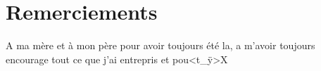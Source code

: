 \chapter*{Remerciements}

A ma m\`{e}re et \`{a} mon p\`{e}re pour avoir toujours \'{e}t\'{e} la, a
m'avoir toujours encourage tout ce que j'ai entrepris et pou<t_ÿ>X
